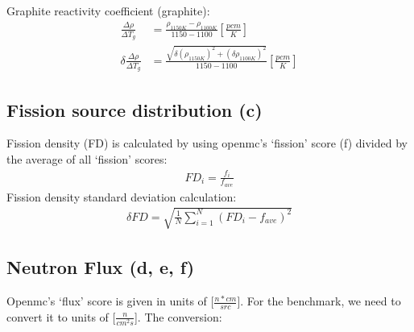 \documentclass[letterpaper,11pt]{article}
\begin{document}
Graphite reactivity coefficient (graphite): 
\begin{align*}
    \frac{\Delta \rho}{\Delta T_g} &= 
    \frac{\rho_{1150K}-\rho_{1100K}}{1150-1100} [\frac{pcm}{K}] \\
    \delta \frac{\Delta \rho}{\Delta T_g} &= 
    \frac{\sqrt{\delta (\rho_{1150K})^2+(\delta \rho_{1100K})^2}}{1150-1100} [\frac{pcm}{K}] 
\end{align*}

\subsection{Fission source distribution (c)}
Fission density (FD) is calculated by using openmc's `fission' score (f) divided 
by the average of all `fission' scores: 
\begin{align*}
    FD_i =  \frac{f_i}{f_{ave}}
\end{align*}
Fission density standard deviation calculation: 
\begin{align*}
    \delta FD = \sqrt{\frac{1}{N}\sum_{i=1}^N(FD_i-f_{ave})^2}
\end{align*}

\subsection{Neutron Flux (d, e, f)}
Openmc's `flux' score is given in units of [$\frac{n * cm}{src}$]. For the benchmark, 
we need to convert it to units of [$\frac{n}{cm^2s}$]. 
The conversion: 
\end{document}

